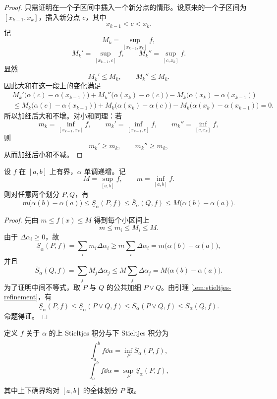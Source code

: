 \begin{proof}
	只需证明在一个子区间中插入一个新分点的情形。设原来的一个子区间为 $[x_{k-1},x_k]$，插入新分点 $c$，其中
	\[
	x_{k-1}<c<x_k.
	\]
	记
	\[
	M_k=\sup_{[x_{k-1},x_k]}f,
	\]
	\[
	M_k'=\sup_{[x_{k-1},c]}f,
	\qquad
	M_k''=\sup_{[c,x_k]}f.
	\]
	显然
	\[
	M_k'\leq M_k,
	\qquad
	M_k''\leq M_k.
	\]
	因此大和在这一段上的变化满足
	\[
	\begin{aligned}
		& M_k'\bigl(\alpha(c)-\alpha(x_{k-1})\bigr)
		+M_k''\bigl(\alpha(x_k)-\alpha(c)\bigr)
		-M_k\bigl(\alpha(x_k)-\alpha(x_{k-1})\bigr) \\
		&\leq
		M_k\bigl(\alpha(c)-\alpha(x_{k-1})\bigr)
		+M_k\bigl(\alpha(x_k)-\alpha(c)\bigr)
		-M_k\bigl(\alpha(x_k)-\alpha(x_{k-1})\bigr)=0.
	\end{aligned}
	\]
	所以加细后大和不增。对小和同理：若
	\[
	m_k=\inf_{[x_{k-1},x_k]}f,
	\qquad
	m_k'=\inf_{[x_{k-1},c]}f,
	\qquad
	m_k''=\inf_{[c,x_k]}f,
	\]
	则
	\[
	m_k'\geq m_k,
	\qquad
	m_k''\geq m_k,
	\]
	从而加细后小和不减。
\end{proof}

\begin{proposition}\label{prop:stieltjes-darboux-bounds}
	设 $f$ 在 $[a,b]$ 上有界，$\alpha$ 单调递增。记
	\[
	M=\sup_{[a,b]}f,
	\qquad
	m=\inf_{[a,b]}f.
	\]
	则对任意两个划分 $P,Q$，有
	\[
	m\bigl(\alpha(b)-\alpha(a)\bigr)
	\leq \underline S_\alpha(P,f)
	\leq \overline S_\alpha(Q,f)
	\leq M\bigl(\alpha(b)-\alpha(a)\bigr).
	\]
\end{proposition}

\begin{proof}
	先由 $m\leq f(x)\leq M$ 得到每个小区间上
	\[
	m\leq m_i\leq M_i\leq M.
	\]
	由于 $\Delta\alpha_i\geq0$，故
	\[
	\underline S_\alpha(P,f)=\sum_i m_i\Delta\alpha_i
	\geq m\sum_i\Delta\alpha_i
	=m\bigl(\alpha(b)-\alpha(a)\bigr),
	\]
	并且
	\[
	\overline S_\alpha(Q,f)=\sum_j M_j\Delta\alpha_j
	\leq M\sum_j\Delta\alpha_j
	=M\bigl(\alpha(b)-\alpha(a)\bigr).
	\]
	为了证明中间不等式，取 $P$ 与 $Q$ 的公共加细 $P\vee Q$。由引理 \ref{lem:stieltjes-refinement}，有
	\[
	\underline S_\alpha(P,f)
	\leq \underline S_\alpha(P\vee Q,f)
	\leq \overline S_\alpha(P\vee Q,f)
	\leq \overline S_\alpha(Q,f).
	\]
	命题得证。
\end{proof}

\begin{definition}
	定义 $f$ 关于 $\alpha$ 的上 Stieltjes 积分与下 Stieltjes 积分为
	\[
	\overline{\int_a^b} f\dd\alpha
	=\inf_P \overline S_\alpha(P,f),
	\]
	\[
	\underline{\int_a^b} f\dd\alpha
	=\sup_P \underline S_\alpha(P,f),
	\]
	其中上下确界均对 $[a,b]$ 的全体划分 $P$ 取。
\end{definition}


